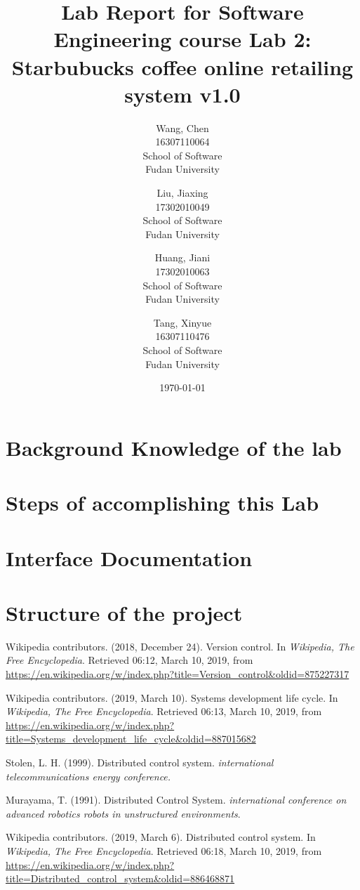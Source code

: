 \documentclass[a4paper]{report}
\title{Lab Report for Software Engineering course \newline
 Lab 2: Starbubucks coffee online retailing system v1.0}
\author{Wang, Chen \\ 16307110064 \\ School of Software\\ Fudan University}
\author{Liu, Jiaxing\\17302010049 \\ School of Software\\ Fudan University}
\author{Huang, Jiani\\17302010063\\School of Software\\ Fudan University}
\author{Tang, Xinyue\\16307110476\\School of Software\\ Fudan University}
\date{\today}
\begin{document}
\maketitle

\tableofcontents

\chapter{Background Knowledge of the lab}


\chapter{Steps of accomplishing this Lab}



\chapter{Interface Documentation}


\chapter{Structure of  the project}



\begin{thebibliography}{A}

Wikipedia contributors. (2018, December 24). Version control. In \emph{Wikipedia, The Free Encyclopedia}. Retrieved 06:12, March 10, 2019, from \url{https://en.wikipedia.org/w/index.php?title=Version_control&oldid=875227317}

Wikipedia contributors. (2019, March 10). Systems development life cycle. In \emph{Wikipedia, The Free Encyclopedia}. Retrieved 06:13, March 10, 2019, from \url{https://en.wikipedia.org/w/index.php?title=Systems_development_life_cycle&oldid=887015682}

Stolen, L. H. (1999). Distributed control system. \emph{international telecommunications energy conference.}

Murayama, T. (1991). Distributed Control System. \emph{international conference on advanced robotics robots in unstructured environments}.

Wikipedia contributors. (2019, March 6). Distributed control system. In \emph{Wikipedia, The Free Encyclopedia}. Retrieved 06:18, March 10, 2019, from \url{https://en.wikipedia.org/w/index.php?title=Distributed_control_system&oldid=886468871}

\end{thebibliography}
\end{document}

